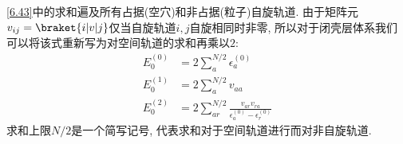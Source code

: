 \autoref{6.43}中的求和遍及所有占据(空穴)和非占据(粒子)自旋轨道. 
由于矩阵元$v_{ij} = \braket{i|v|j}$仅当自旋轨道$i,j$自旋相同时非零, 
所以对于闭壳层体系我们可以将该式重新写为对空间轨道的求和再乘以$2$:
\begin{subequations}\label{6.44}
	\begin{align}\label{6.44a}
	E_0^{(0)} & = 2\sum_a^{N/2}\epsilon_a^{(0)}\\\label{6.44b}
	E_0^{(1)} & = 2\sum_a^{N/2}v_{aa} \\\label{6.44c}
	E_0^{(2)} & = 2\sum_{ar}^{N/2}\frac{v_{ar}v_{ra}}{\epsilon_a^{(0)} - \epsilon_r^{(0)}}
	\end{align}
\end{subequations}
求和上限$N/2$是一个简写记号, 
代表求和对于空间轨道进行而对非自旋轨道.

